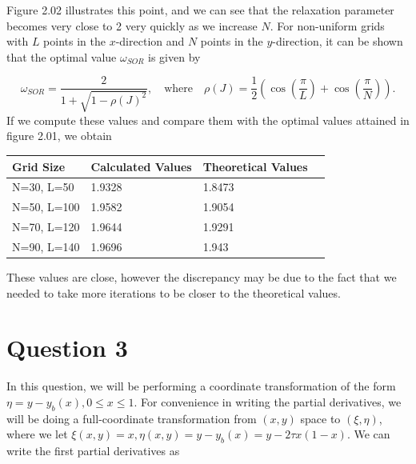 \documentclass[12pt]{article}
\begin{document}
    Figure 2.02 illustrates this point, and we can see that the relaxation parameter becomes very close to 2 very quickly as we increase $N$. For non-uniform grids with $L$ points in the $x$-direction and $N$ points in the $y$-direction, it can be shown that the optimal value $\omega_{SOR}$ is given by

    \begin{equation}
        \omega_{SOR} = \frac{2}{1 + \sqrt{1 - \rho (J)^2}}, \quad \text{where} \quad \rho (J) = \frac{1}{2}\left(\cos \left(\frac{\pi}{L}\right) + \cos \left(\frac{\pi}{N}\right)\right).
    \end{equation}
    If we compute these values and compare them with the optimal values attained in figure 2.01, we obtain

    \begin{center}
        \begin{tabular}{llll}
            \toprule
                Grid Size & Calculated Values & Theoretical Values \\
            \midrule
                N=30, L=50 &            1.9328 &             1.8473 \\
                N=50, L=100 &            1.9582 &             1.9054 \\
                N=70, L=120 &            1.9644 &             1.9291 \\
                N=90, L=140 &            1.9696 &              1.943 \\
            \bottomrule
        \end{tabular}
    \end{center}

    These values are close, however the discrepancy may be due to the fact that we needed to take more iterations to be closer to the theoretical values.


\newpage
\section{Question 3}
    In this question, we will be performing a coordinate transformation of the form $\eta = y - y_b(x), 0 \leq x \leq 1.$ For convenience in writing the partial derivatives, we will be doing a full-coordinate transformation from $(x, y)$ space to $(\xi, \eta)$, where we let $\xi(x, y) = x, \eta(x, y) = y - y_b(x) = y - 2\tau x(1-x)$. We can write the first partial derivatives as
\end{document}

